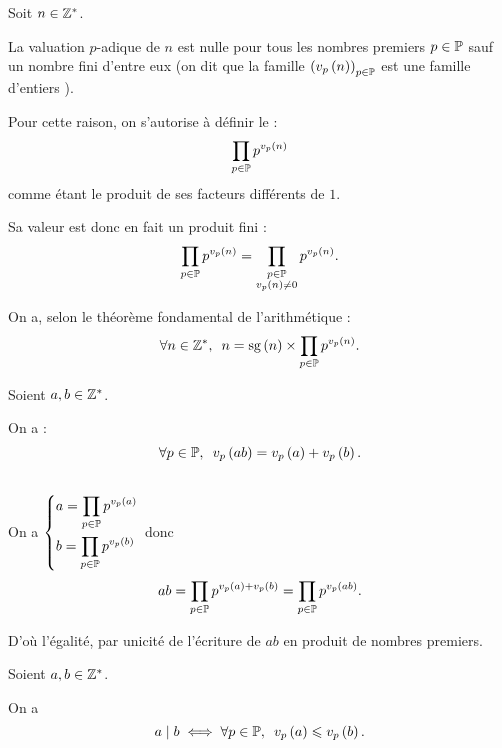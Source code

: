 \begin{nota}
Soit \(n\in\mathbb{Z}^*\).

La valuation \(p\)-adique de \(n\) est nulle pour tous les nombres premiers \(p\in\mathbb{P}\) sauf un nombre fini d'entre eux (on dit que la famille \(\left(v_{p}\left(n\right)\right)_{p\in\mathbb{P}}\) est une famille d'entiers ).

Pour cette raison, on s'autorise à définir le  : \[\prod_{p\in\mathbb{P}}p^{v_{p}\left(n\right)}\] comme étant le produit de ses facteurs différents de \(1\).

Sa valeur est donc en fait un produit fini : \[\prod_{p\in\mathbb{P}}p^{v_{p}\left(n\right)}=\prod_{\substack{p\in\mathbb{P} \\ v_{p}\left(n\right)\not=0}}p^{v_{p}\left(n\right)}.\]
\end{nota}

\begin{cor}
On a, selon le théorème fondamental de l'arithmétique : \[\quantifs{\forall n\in\Zs}n=\sg\paren{n}\times\prod_{p\in\prem}p^{\valp{p}{n}}.\]
\end{cor}

\begin{prop}
Soient \(a,b\in\mathbb{Z}^*\).

On a : \[\quantifs{\forall p\in\prem}\valp{p}{ab}=\valp{p}{a}+\valp{p}{b}.\]
\end{prop}

\begin{dem}~\\
On a \(\begin{dcases}a=\prod_{p\in\mathbb{P}}p^{v_{p}\left(a\right)} \\ b=\prod_{p\in\mathbb{P}}p^{v_{p}\left(b\right)}\end{dcases}\) donc \[ab=\prod_{p\in\mathbb{P}}p^{v_{p}\left(a\right)+v_{p}\left(b\right)}=\prod_{p\in\mathbb{P}}p^{v_{p}\left(ab\right)}.\]

D'où l'égalité, par unicité de l'écriture de \(ab\) en produit de nombres premiers.
\end{dem}

\begin{prop}
Soient \(a,b\in\mathbb{Z}^*\).

On a \[a\divise b\ssi\quantifs{\forall p\in\prem}\valp{p}{a}\leq\valp{p}{b}.\]
\end{prop}

